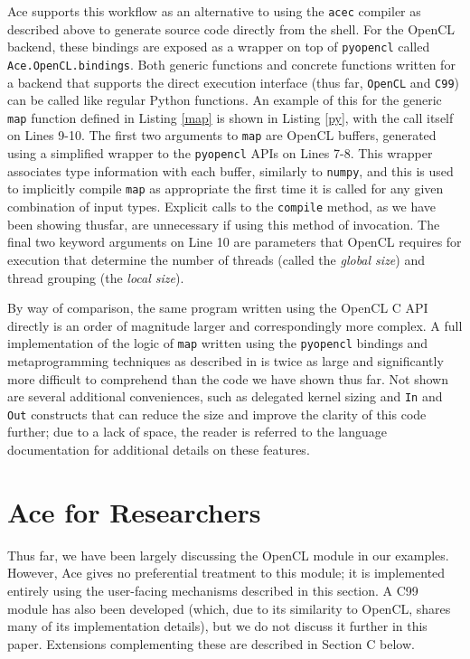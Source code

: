 \documentclass[10pt]{sigplanconf}
\begin{document}
Ace supports this workflow as an alternative to using the \verb|acec| compiler as described above to generate  source code directly from the shell. For the OpenCL backend, these bindings are exposed as a wrapper on top of \verb|pyopencl| called \verb|Ace.OpenCL.bindings|. Both generic functions and concrete functions written for a backend that supports the direct execution interface (thus far, \verb|OpenCL| and \verb|C99|) can be called like regular Python functions. An example of this for the generic \verb|map| function defined in Listing \ref{map} is shown in Listing \ref{py}, with the call itself on Lines 9-10. The first two arguments to \verb|map| are OpenCL buffers, generated using a simplified wrapper to the \verb|pyopencl| APIs on Lines 7-8. This wrapper associates type information with each buffer, similarly to \verb|numpy|, and this is used to implicitly compile \verb|map| as appropriate the first time it is called for any given combination of input types. Explicit calls to the \verb|compile| method, as we have been showing thusfar, are unnecessary if using this method of invocation. The final two keyword arguments on Line 10 are parameters that OpenCL requires for execution that determine the number of threads (called the {\em global size}) and thread grouping (the {\em local size}). 

By way of comparison, the same program written using the OpenCL C API directly is an order of magnitude larger and correspondingly more complex. A full implementation of the logic of \verb|map| written using the \verb|pyopencl| bindings and metaprogramming techniques as described in \cite{pyopencl} is twice as large and significantly more difficult to comprehend than the code we have shown thus far. Not shown are several additional conveniences, such as delegated kernel sizing and \verb|In| and \verb|Out| constructs that can reduce the size and improve the clarity of this code further; due to a lack of space, the reader is referred to the language documentation for additional details on these features.

\section{Ace for Researchers}
Thus far, we have been largely discussing the OpenCL module in our examples. However, Ace gives no preferential treatment to this module; it is implemented entirely using the user-facing mechanisms described in this section. A C99 module has also been developed (which, due to its similarity to OpenCL, shares many of its implementation details), but we do not discuss it further in this paper. Extensions complementing these are described in Section C below.
\end{document}
